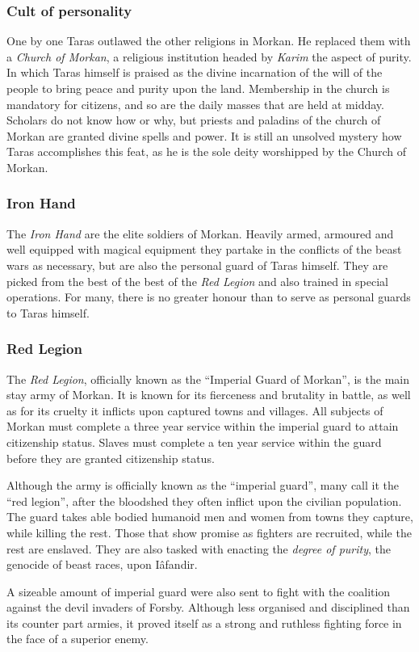 \subsubsection*{Cult of personality}

One by one Taras outlawed the other religions in Morkan. He replaced them with
a \emph{Church of Morkan}, a religious institution headed by \emph{Karim} the
aspect of purity. In which Taras himself is praised as the divine incarnation
of the will of the people to bring peace and purity upon the land. Membership
in the church is mandatory for citizens, and so are the daily masses that are
held at midday. Scholars do not know how or why, but priests and paladins of
the church of Morkan are granted divine spells and power. It is still an
unsolved mystery how Taras accomplishes this feat, as he is the sole deity
worshipped by the Church of Morkan.

\subsubsection*{Iron Hand}

The \emph{Iron Hand} are the elite soldiers of Morkan. Heavily armed, armoured
and well equipped with magical equipment they partake in the conflicts of the
beast wars as necessary, but are also the personal guard of Taras himself. They
are picked from the best of the best of the \emph{Red Legion} and also trained
in special operations. For many, there is no greater honour than to serve as
personal guards to Taras himself.

\subsubsection*{Red Legion}

The \emph{Red Legion}, officially known as the ``Imperial Guard of Morkan'',
is the main stay army of Morkan. It is known for its fierceness and brutality
in battle, as well as for its cruelty it inflicts upon captured towns and
villages.  All subjects of Morkan must complete a three year service within
the imperial guard to attain citizenship status. Slaves must complete a ten
year service within the guard before they are granted citizenship status.

Although the army is officially known as the ``imperial guard'', many call it
the ``red legion'', after the bloodshed they often inflict upon the civilian
population. The guard takes able bodied humanoid men and women from towns they
capture, while killing the rest. Those that show promise as fighters are
recruited, while the rest are enslaved. They are also tasked with enacting the
\emph{degree of purity}, the genocide of beast races, upon Iâfandir.

A sizeable amount of imperial guard were also sent to fight with the coalition
against the devil invaders of Forsby. Although less organised and disciplined
than its counter part armies, it proved itself as a strong and ruthless
fighting force in the face of a superior enemy.
